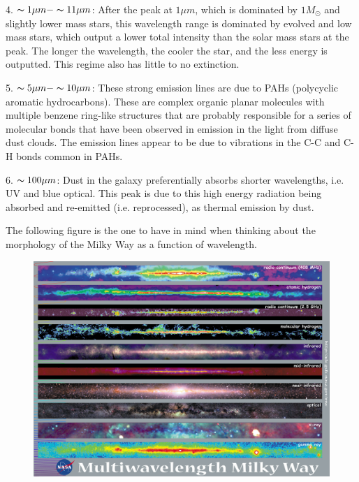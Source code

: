 \begin{enumerate}
4.  $  \thicksim 1 \mu m - \thicksim 11 \mu m$:  After the peak at $1 \mu m$, which is dominated by $1 M_\odot$ and slightly lower mass stars, this wavelength range is dominated by evolved and low mass stars, which output a lower total intensity than the solar mass stars at the peak.  The longer the wavelength, the cooler the star, and the less energy is outputted.  This regime also has little to no extinction.   

5.  $\thicksim 5 \mu m - \thicksim 10 \mu m$:  These strong emission lines are due to PAHs (polycyclic aromatic hydrocarbons).  These are complex organic planar molecules with multiple benzene ring-like structures that are probably responsible for a series of molecular bonds that have been observed in emission in the light from diffuse dust clouds.  The emission lines appear to be due to vibrations in the C-C and C-H bonds common in PAHs.  

6.  $\thicksim 100 \mu m$:  Dust in the galaxy preferentially absorbs shorter wavelengths, i.e. UV and blue optical.  This peak is due to this high energy radiation being absorbed and re-emitted (i.e. reprocessed), as thermal emission by dust.


The following figure is the one to have in mind when thinking about the morphology of the Milky Way as a function of wavelength.

\begin{figure}[!h]
\begin{center}
\includegraphics[width=\textwidth]{MW_morphology.jpg}
\end{center}
\end{figure}


\end{enumerate}
